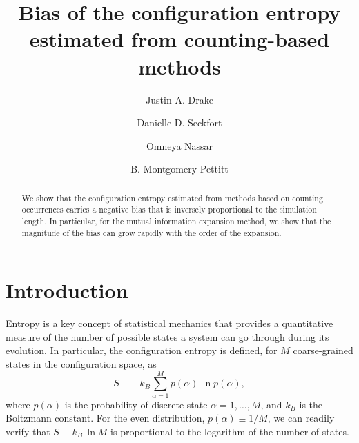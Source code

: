 \documentclass[preprint, superscriptaddress]{revtex4-1}
\begin{document}
\title{Bias of the configuration entropy estimated from counting-based methods}

\author{Justin A. Drake}
\author{Danielle D. Seckfort}
\author{Omneya Nassar}
\author{B. Montgomery Pettitt}

\begin{abstract}
We show that the configuration entropy estimated from methods based on counting occurrences
carries a negative bias
that is inversely proportional to the simulation length.
%
In particular, for the mutual information expansion method,
we show that the magnitude of the bias can grow rapidly with the order of the expansion.
\end{abstract}

\maketitle


\section{Introduction}

Entropy is a key concept of statistical mechanics that provides a quantitative measure of
the number of possible states a system can go through during its evolution.
%
In particular, the configuration entropy is defined,
for $M$ coarse-grained states in the configuration space, as
%
\begin{equation}
  S
  \equiv
  -k_B \sum_{\alpha = 1}^M p(\alpha) \, \ln p(\alpha)
  ,
  \label{eq:entropy_def}
\end{equation}
%
where $p(\alpha)$ is the probability of discrete state $\alpha = 1, \dots, M$,
and $k_B$ is the Boltzmann constant.
%
For the even distribution, $p(\alpha) \equiv 1/M$,
we can readily verify that $S \equiv k_B \, \ln M$
is proportional to the logarithm of the number of states.
\end{document}
